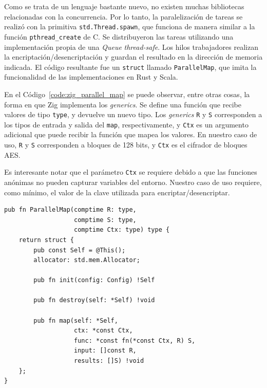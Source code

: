 \documentclass[11pt]{article}
\newcommand{\english}[1]{\textit{#1}}
\begin{document}
Como se trata de un lenguaje bastante nuevo, no existen muchas bibliotecas relacionadas con la concurrencia. Por lo tanto, la paralelización de tareas se realizó con la primitiva \lstinline{std.Thread.spawn}, que funciona de manera similar a la función \lstinline{pthread_create} de C. Se distribuyeron las tareas utilizando una implementación propia de una \english{Queue} \english{thread-safe}. Los hilos trabajadores realizan la encriptación/desencriptación y guardan el resultado en la dirección de memoria indicada. El código resultante fue un \lstinline{struct} llamado \lstinline{ParallelMap}, que imita la funcionalidad de las implementaciones en Rust y Scala.

En el Código~\ref{code:zig_parallel_map} se puede observar, entre otras cosas, la forma en que Zig implementa los \english{generics}. Se define una función que recibe valores de tipo \lstinline{type}, y devuelve un nuevo tipo. Los \english{generics} \lstinline{R} y \lstinline{S} corresponden a los tipos de entrada y salida del \lstinline{map}, respectivamente, y \lstinline{Ctx} es un argumento adicional que puede recibir la función que mapea los valores. En nuestro caso de uso, \lstinline{R} y \lstinline{S} corresponden a bloques de 128 bits, y \lstinline{Ctx} es el cifrador de bloques AES. 

Es interesante notar que el parámetro \lstinline{Ctx} se requiere debido a que las funciones anónimas no pueden capturar variables del entorno. Nuestro caso de uso requiere, como mínimo, el valor de la clave utilizada para encriptar/desencriptar.

\begin{listing}[h]
\begin{verbatim}
pub fn ParallelMap(comptime R: type,
                   comptime S: type,
                   comptime Ctx: type) type {
    return struct {
        pub const Self = @This();
        allocator: std.mem.Allocator;

        pub fn init(config: Config) !Self

        pub fn destroy(self: *Self) !void

        pub fn map(self: *Self,
                   ctx: *const Ctx,
                   func: *const fn(*const Ctx, R) S,
                   input: []const R,
                   results: []S) !void
    };
}
\end{verbatim}
\caption{Definición abreviada del \lstinline{ParallelMap} en Zig}
\label{code:zig_parallel_map}
\end{listing}
\end{document}

